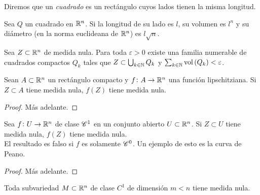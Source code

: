 \begin{defi}[cuadrado]
    Diremos que un \textit{cuadrado} es un rectángulo cuyos lados tienen la misma
    longitud.
\end{defi}
\begin{prop}
    Sea $Q$ un cuadrado en $\mathbb{R} ^n$. Si la longitud de su lado es $l$, su volumen
    es $l^n$ y su diámetro (en la norma euclideana de $\mathbb{R}^n$) es $l\sqrt{n}$.
\end{prop}
\begin{prop}
    Sea $Z \subset \mathbb{R}^n$ de medida nula. Para toda $\varepsilon >0$ existe una
    familia numerable de cuadrados compactos $Q_k$ tales que $Z\subset
    \bigcup_{k \in \mathbb{N}} Q_k$ y $\sum_{k \in \mathbb{N}} \operatorname{vol} \left( Q_k \right) <
    \varepsilon$.
\end{prop}
\begin{lema}
    Sean $A\subset \mathbb{R}^n$ un rectángulo compacto y $f\colon A \to \mathbb{R}^n$ una
    función lipschitziana. Si $Z \subset A$ tiene medida nula, $f\left(Z \right)$
    tiene medida nula.
\end{lema}
\begin{proof}
    Más adelante.
\end{proof}
\begin{prop}
    Sea $f \colon U \to \mathbb{R}^n$ de clase $\mathscr{C} ^1$ en un conjunto abierto $U \subset
    \mathbb{R} ^n$. Si $Z \subset U$ tiene medida nula, $f\left( Z \right) $ tiene
    medida nula.\\
    El resultado es falso si $f$ es solamente $\mathscr{C} ^0$. Un ejemplo de esto es la
    curva de Peano.
\end{prop}
\begin{proof}
    Más adelante.
\end{proof}
\begin{col}
    Toda subvariedad $M \subset \mathbb{R}^n$ de clase $C^1$ de dimensión $m<n$ tiene
    medida nula.
\end{col}

